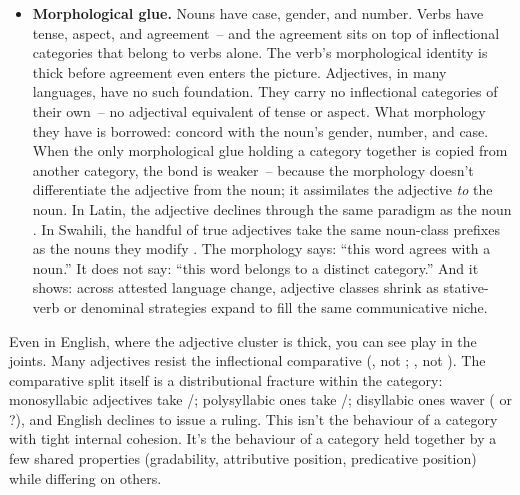 \begin{itemize}
    \item \textbf{Morphological glue.} Nouns have case, gender, and number. Verbs have tense, aspect, and agreement~-- and the agreement sits on top of inflectional categories that belong to verbs alone. The verb's morphological identity is thick before agreement even enters the picture. Adjectives, in many languages, have no such foundation. They carry no inflectional categories of their own~-- no adjectival equivalent of tense or aspect. What morphology they have is borrowed: concord with the noun's gender, number, and case. When the only morphological glue holding a category together is copied from another category, the bond is weaker~-- because the morphology doesn't differentiate the adjective from the noun; it assimilates the adjective \emph{to} the noun. In Latin, the adjective  declines through the same paradigm as the noun  \citep[a familiar constraint; see][]{allen1903}. In Swahili, the handful of true adjectives take the same noun-class prefixes as the nouns they modify \citep{schadeberg1992}. The morphology says: \enquote{this word agrees with a noun.} It does not say: \enquote{this word belongs to a distinct category.} And it shows: across attested language change, adjective classes shrink as stative-verb or denominal strategies expand to fill the same communicative niche.
\end{itemize}

Even in English, where the adjective cluster is thick, you can see play in the joints. Many adjectives resist the inflectional comparative (, not ; , not ). The comparative split itself is a distributional fracture within the category: monosyllabic adjectives take /; polysyllabic ones take /; disyllabic ones waver ( or ?), and English declines to issue a ruling. This isn't the behaviour of a category with tight internal cohesion. It's the behaviour of a category held together by a few shared properties (gradability, attributive position, predicative position) while differing on others.

